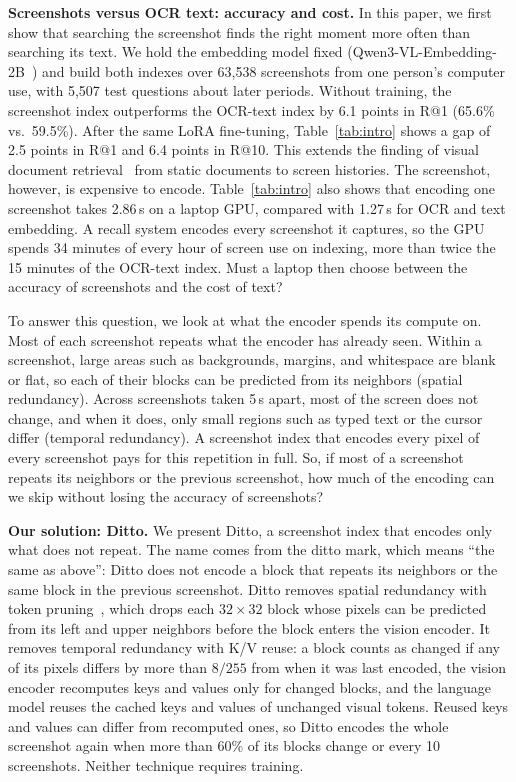 \textbf{Screenshots versus OCR text: accuracy and cost.}
In this paper, we first show that searching the screenshot finds the right
moment more often than searching its text. We hold the embedding model fixed
(Qwen3-VL-Embedding-2B~) and build both indexes
over 63,538 screenshots from one person's computer use, with 5,507 test
questions about later periods. Without training, the screenshot index
outperforms the OCR-text index by 6.1 points in R@1 (65.6\% vs.\ 59.5\%).
After the same LoRA fine-tuning, Table~\ref{tab:intro} shows a gap of 2.5
points in R@1 and 6.4 points in R@10. This extends the finding of visual
document retrieval~\cite{ma2024dse,faysse2025colpali} from static documents
to screen histories. The screenshot, however, is expensive to encode.
Table~\ref{tab:intro} also shows that encoding one screenshot takes 2.86\,s
on a laptop GPU, compared with 1.27\,s for OCR and text embedding. A recall
system encodes every screenshot it captures, so the GPU spends 34 minutes of
every hour of screen use on indexing, more than twice the 15 minutes of the
OCR-text index. Must a laptop then choose between the accuracy of
screenshots and the cost of text?

To answer this question, we look at what the encoder spends its compute on.
Most of each screenshot repeats what the encoder has already seen. Within a
screenshot, large areas such as backgrounds, margins, and whitespace are
blank or flat, so each of their blocks can be predicted from its neighbors
(spatial redundancy). Across screenshots taken 5\,s apart, most of the
screen does not change, and when it does, only small regions such as typed
text or the cursor differ (temporal redundancy). A screenshot index that
encodes every pixel of every screenshot pays for this repetition in full.
So, if most of a screenshot repeats its neighbors or the previous
screenshot, how much of the encoding can we skip without losing the
accuracy of screenshots?

\textbf{Our solution: Ditto.}
We present Ditto, a screenshot index that encodes only what does not repeat.
The name comes from the ditto mark, which means ``the same as above'': Ditto does not encode a block that repeats its neighbors or the
same block in the previous screenshot. Ditto removes spatial redundancy with
token pruning~, which drops each $32{\times}32$ block
whose pixels can be predicted from its left and upper neighbors before the
block enters the vision encoder. It removes temporal redundancy with K/V
reuse: a block counts as changed if any of its pixels differs by more than
$8/255$ from when it was last encoded, the vision encoder recomputes keys
and values only for changed blocks, and the language model reuses the
cached keys and values of unchanged visual tokens. Reused keys and values
can differ from recomputed ones, so Ditto encodes the whole screenshot again
when more than 60\% of its blocks change or every 10 screenshots. Neither
technique requires training.

